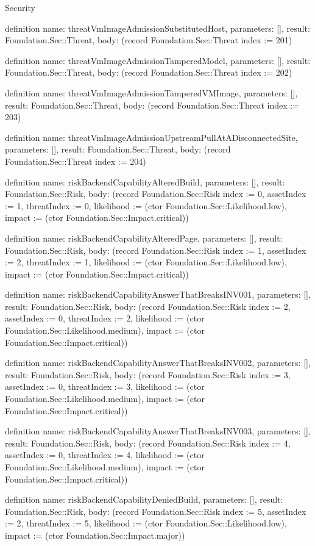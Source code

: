 \begin{lexlean}{Security}
\begin{semanticmodule}
definition{
  name: threatVmImageAdmissionSubstitutedHost,
  parameters: [],
  result: Foundation.Sec::Threat,
  body: (record Foundation.Sec::Threat {index := 201})
}

definition{
  name: threatVmImageAdmissionTamperedModel,
  parameters: [],
  result: Foundation.Sec::Threat,
  body: (record Foundation.Sec::Threat {index := 202})
}

definition{
  name: threatVmImageAdmissionTamperedVMImage,
  parameters: [],
  result: Foundation.Sec::Threat,
  body: (record Foundation.Sec::Threat {index := 203})
}

definition{
  name: threatVmImageAdmissionUpstreamPullAtADisconnectedSite,
  parameters: [],
  result: Foundation.Sec::Threat,
  body: (record Foundation.Sec::Threat {index := 204})
}

definition{
  name: riskBackendCapabilityAlteredBuild,
  parameters: [],
  result: Foundation.Sec::Risk,
  body: (record Foundation.Sec::Risk {index := 0, assetIndex := 1, threatIndex := 0, likelihood := (ctor Foundation.Sec::Likelihood.low), impact := (ctor Foundation.Sec::Impact.critical)})
}

definition{
  name: riskBackendCapabilityAlteredPage,
  parameters: [],
  result: Foundation.Sec::Risk,
  body: (record Foundation.Sec::Risk {index := 1, assetIndex := 2, threatIndex := 1, likelihood := (ctor Foundation.Sec::Likelihood.low), impact := (ctor Foundation.Sec::Impact.critical)})
}

definition{
  name: riskBackendCapabilityAnswerThatBreaksINV001,
  parameters: [],
  result: Foundation.Sec::Risk,
  body: (record Foundation.Sec::Risk {index := 2, assetIndex := 0, threatIndex := 2, likelihood := (ctor Foundation.Sec::Likelihood.medium), impact := (ctor Foundation.Sec::Impact.critical)})
}

definition{
  name: riskBackendCapabilityAnswerThatBreaksINV002,
  parameters: [],
  result: Foundation.Sec::Risk,
  body: (record Foundation.Sec::Risk {index := 3, assetIndex := 0, threatIndex := 3, likelihood := (ctor Foundation.Sec::Likelihood.medium), impact := (ctor Foundation.Sec::Impact.critical)})
}

definition{
  name: riskBackendCapabilityAnswerThatBreaksINV003,
  parameters: [],
  result: Foundation.Sec::Risk,
  body: (record Foundation.Sec::Risk {index := 4, assetIndex := 0, threatIndex := 4, likelihood := (ctor Foundation.Sec::Likelihood.medium), impact := (ctor Foundation.Sec::Impact.critical)})
}

definition{
  name: riskBackendCapabilityDeniedBuild,
  parameters: [],
  result: Foundation.Sec::Risk,
  body: (record Foundation.Sec::Risk {index := 5, assetIndex := 2, threatIndex := 5, likelihood := (ctor Foundation.Sec::Likelihood.low), impact := (ctor Foundation.Sec::Impact.major)})
}


\end{semanticmodule}
\end{lexlean}
